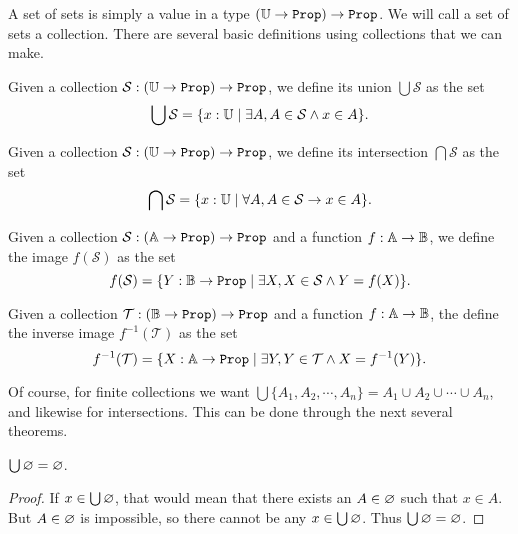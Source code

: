 \documentclass[../../math.tex]{subfiles}
\begin{document}
A set of sets is simply a value in a type $(\U \rightarrow \Prop) \rightarrow
\Prop$.  We will call a set of sets a collection.  There are several basic
definitions using collections that we can make.

\begin{definition}
    Given a collection $\mathcal S : (\U \rightarrow \Prop) \rightarrow \Prop$,
    we define its union $\bigcup \mathcal S$ as the set
    \[
        \bigcup \mathcal S =
            \{x : \mathbb{U} \mid \exists A, A \in \mathcal S \wedge x \in A\}.
    \]
\end{definition}

\begin{definition}
    Given a collection $\mathcal S : (\U \rightarrow \Prop) \rightarrow \Prop$,
    we define its intersection $\bigcap \mathcal S$ as the set
    \[
        \bigcap \mathcal S =
            \{x : \mathbb{U} \mid \forall A, A \in \mathcal S \rightarrow x \in A\}.
    \]
\end{definition}

\begin{definition}
    Given a collection $\mathcal S : (\A \rightarrow \Prop) \rightarrow \Prop$
    and a function $f : \mathbb{A} \rightarrow \mathbb{B}$, we define the image $f(\mathcal S)$
    as the set
    \[
        f(\mathcal S) =
            \{Y : \B \rightarrow \Prop \mid
            \exists X, X \in \mathcal S \wedge Y = f(X)\}.
    \]
\end{definition}

\begin{definition}
    Given a collection $\mathcal T : (\B \rightarrow \Prop) \rightarrow \Prop$
    and a function $f : \mathbb{A} \rightarrow \mathbb{B}$, the define the inverse image
    $f^{-1}(\mathcal T)$ as the set
    \[
        f^{-1}(\mathcal T) =
            \{X : \A \rightarrow \Prop \mid
            \exists Y, Y \in \mathcal T \wedge X = f^{-1}(Y)\}.
    \]
\end{definition}

Of course, for finite collections we want $\bigcup\{A_1, A_2, \cdots, A_n\} =
A_1 \cup A_2 \cup \cdots \cup A_n$, and likewise for intersections.  This can be
done through the next several theorems.

\begin{theorem}
    $\bigcup \varnothing = \varnothing$.
\end{theorem}
\begin{proof}
    If $x \in \bigcup \varnothing$, that would mean that there exists an $A \in
    \varnothing$ such that $x \in A$.  But $A \in \varnothing$ is impossible, so there
    cannot be any $x \in \bigcup \varnothing$.  Thus $\bigcup \varnothing = \varnothing$.
\end{proof}
\end{document}
